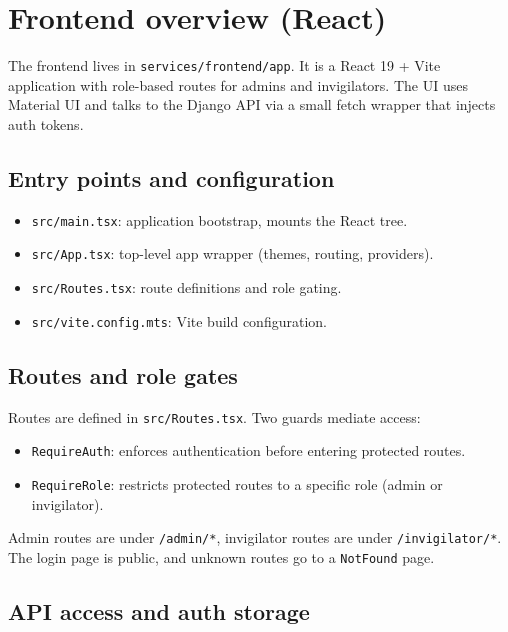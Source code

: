 \section{Frontend overview (React)}
\label{sec:frontend}

The frontend lives in \texttt{services/frontend/app}. It is a React 19 + Vite application with role-based routes for admins and invigilators. The UI uses Material UI and talks to the Django API via a small fetch wrapper that injects auth tokens.

\subsection{Entry points and configuration}
\label{subsec:frontend:entrypoints}

\begin{itemize}
  \item \texttt{src/main.tsx}: application bootstrap, mounts the React tree.
  \item \texttt{src/App.tsx}: top-level app wrapper (themes, routing, providers).
  \item \texttt{src/Routes.tsx}: route definitions and role gating.
  \item \texttt{src/vite.config.mts}: Vite build configuration.
\end{itemize}

\subsection{Routes and role gates}
\label{subsec:frontend:routes}

Routes are defined in \texttt{src/Routes.tsx}. Two guards mediate access:

\begin{itemize}
  \item \texttt{RequireAuth}: enforces authentication before entering protected routes.
  \item \texttt{RequireRole}: restricts protected routes to a specific role (admin or invigilator).
\end{itemize}

Admin routes are under \texttt{/admin/*}, invigilator routes are under \texttt{/invigilator/*}. The login page is public, and unknown routes go to a \texttt{NotFound} page.

\subsection{API access and auth storage}
\label{subsec:frontend:api}

